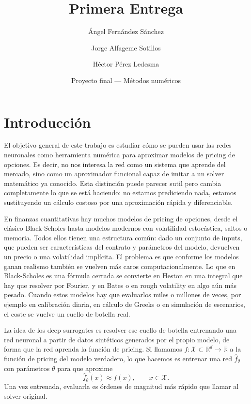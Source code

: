 \documentclass[11pt,a4paper]{article}
\title{Primera Entrega}
\author{Ángel Fernández Sánchez \and Jorge Alfageme Sotillos \and Héctor Pérez Ledesma}
\date{Proyecto final --- Métodos numéricos}
\begin{document}
\maketitle

\tableofcontents
\vspace{1em}

\section{Introducción}

El objetivo general de este trabajo es estudiar cómo se pueden usar las redes neuronales como herramienta numérica para aproximar modelos de pricing de opciones. Es decir, no nos interesa la red como un sistema que aprende del mercado, sino como un aproximador funcional capaz de imitar a un solver matemático ya conocido. Esta distinción puede parecer sutil pero cambia completamente lo que se está haciendo: no estamos prediciendo nada, estamos sustituyendo un cálculo costoso por una aproximación rápida y diferenciable.

En finanzas cuantitativas hay muchos modelos de pricing de opciones, desde el clásico Black-Scholes hasta modelos modernos con volatilidad estocástica, saltos o memoria. Todos ellos tienen una estructura común: dado un conjunto de inputs, que pueden ser características del contrato y parámetros del modelo, devuelven un precio o una volatilidad implícita. El problema es que conforme los modelos ganan realismo también se vuelven más caros computacionalmente. Lo que en Black-Scholes es una fórmula cerrada se convierte en Heston en una integral que hay que resolver por Fourier, y en Bates o en rough volatility en algo aún más pesado. Cuando estos modelos hay que evaluarlos miles o millones de veces, por ejemplo en calibración diaria, en cálculo de Greeks o en simulación de escenarios, el coste se vuelve un cuello de botella real.

La idea de los deep surrogates es resolver ese cuello de botella entrenando una red neuronal a partir de datos sintéticos generados por el propio modelo, de forma que la red aprenda la función de pricing. Si llamamos $f: \mathcal{X} \subset \mathbb{R}^d \to \mathbb{R}$ a la función de pricing del modelo verdadero, lo que hacemos es entrenar una red $\hat{f}_\theta$ con parámetros $\theta$ para que aproxime
\begin{equation}
\hat{f}_\theta(x) \approx f(x), \qquad x \in \mathcal{X}.
\end{equation}
Una vez entrenada, evaluarla es órdenes de magnitud más rápido que llamar al solver original.
\end{document}
